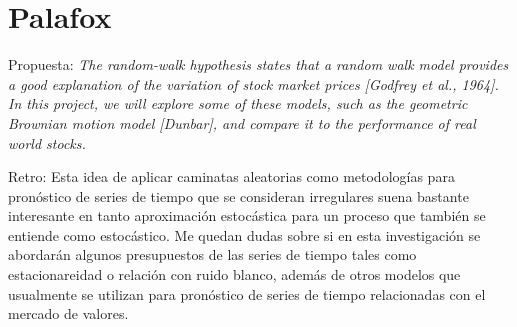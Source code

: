 \documentclass[10pt, oneside,spanish]{article}   	%
\begin{document}
\section{Palafox}

Propuesta: \emph{The random-walk hypothesis states that a random walk model provides a good explanation of the variation of stock market prices [Godfrey et al., 1964]. In this project, we will explore some of these models, such as the geometric Brownian motion model [Dunbar], and compare it to the performance of real world stocks.}

Retro: Esta idea de aplicar caminatas aleatorias como metodologías para pronóstico de series de tiempo que se consideran irregulares suena bastante interesante en tanto aproximación estocástica para un proceso que también se entiende como estocástico. Me quedan dudas sobre si en esta investigación se abordarán algunos presupuestos de las series de tiempo tales como estacionareidad o relación con ruido blanco, además de otros modelos que usualmente se utilizan para pronóstico de series de tiempo relacionadas con el mercado de valores.
\end{document}
